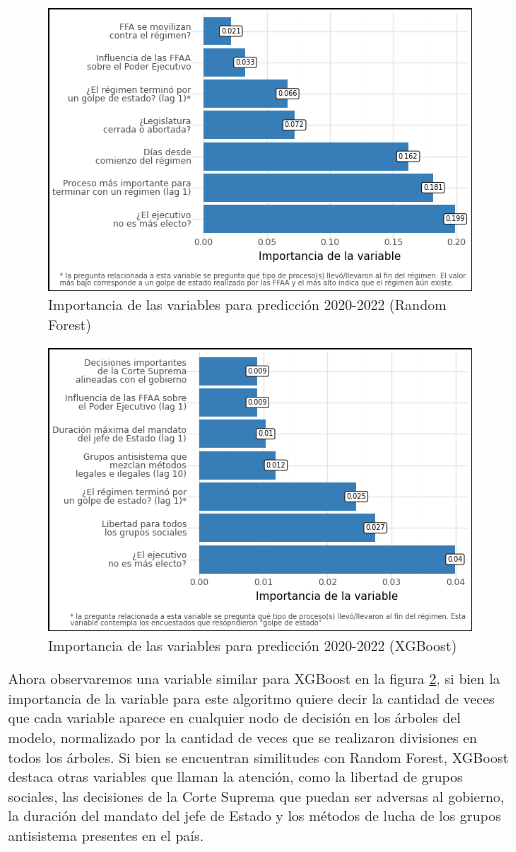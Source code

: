 \documentclass{article}
\begin{document}
\begin{figure}[H]
  \centering  
  \includegraphics[width=1\textwidth]{7_feature_importance_rf.png}
  \caption{Importancia de las variables para predicción 2020-2022 (Random Forest) \label{fig:feat_imp_rf}}
\end{figure}

\begin{figure}[H]
  \centering  
  \includegraphics[width=1\textwidth]{8_feature_importance_xgb.png}
  \caption{Importancia de las variables para predicción 2020-2022 (XGBoost) \label{fig:feat_imp_xgb}}
\end{figure}

Ahora observaremos una variable similar para XGBoost en la figura \ref{fig:feat_imp_xgb}, si bien la 
importancia de la variable para este algoritmo quiere decir la cantidad de veces que cada variable 
aparece en cualquier nodo de decisión en los árboles del modelo, normalizado por la cantidad de veces
que se realizaron divisiones en todos los árboles. Si bien se encuentran similitudes con Random Forest,
XGBoost destaca otras variables que llaman la atención, como la libertad de grupos sociales, las 
decisiones de la Corte Suprema que puedan ser adversas al gobierno, la duración del mandato del jefe de 
Estado y los métodos de lucha de los grupos antisistema presentes en el país.
\end{document}

